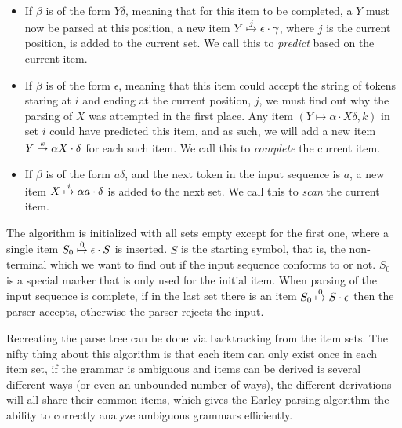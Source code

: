 		\begin{itemize}
			\item

				If $\beta$ is of the form $Y\delta$, meaning that for this item
				to be completed, a $Y$ must now be parsed at this position, a
				new item $\earley{Y}{\epsilon}{\gamma}{j}$, where $j$ is the
				current position, is added to the current set. We call this to
				\emph{predict} based on the current item.

			\item

				If $\beta$ is of the form $\epsilon$, meaning that this item
				could accept the string of tokens staring at $i$ and ending at
				the current position, $j$, we must find out why the parsing of
				$X$ was attempted in the first place. Any item $(Y \mapsto
				\alpha \cdot X\delta, k)$ in set $i$  could have predicted this
				item, and as such, we will add a new item $\earley{Y}{\alpha
				X}{\delta}{k}$ for each such item. We call this to
				\emph{complete} the current item.

			\item

				If $\beta$ is of the form $a\delta$, and the next token in the
				input sequence is $a$, a new item $\earley{X}{\alpha
				a}{\delta}{i}$ is added to the next set. We call this to
				\emph{scan} the current item.

		\end{itemize}

		The algorithm is initialized with all sets empty except for the first
		one, where a single item $\earley{S_0}{\epsilon}{S}{0}$ is inserted.
		$S$ is the starting symbol, that is, the non-terminal which we want to
		find out if the input sequence conforms to or not. $S_0$ is a special
		marker that is only used for the initial item. When parsing of the
		input sequence is complete, if in the last set there is an item
		$\earley{S_0}{S}{\epsilon}{0}$ then the parser accepts, otherwise the
		parser rejects the input.

		Recreating the parse tree can be done via backtracking from the item
		sets. The nifty thing about this algorithm is that each item can only
		exist once in each item set, if the grammar is ambiguous and items can
		be derived is several different ways (or even an unbounded number of
		ways), the different derivations will all share their common items,
		which gives the Earley parsing algorithm the ability to correctly
		analyze ambiguous grammars efficiently.

